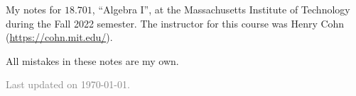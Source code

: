 \documentclass[11pt]{article}
\begin{document}
\maketitle

My notes for $18.701$, ``Algebra I'', at the Massachusetts Institute of Technology during the Fall 2022 semester. The instructor for this course was Henry Cohn (\url{https://cohn.mit.edu/}). 

All mistakes in these notes are my own. 

\vfill

\hfill \textcolor{gray}{\small Last updated on \today.}
\newpage
\tableofcontents 
\newpage
\importfiles %
\end{document}
